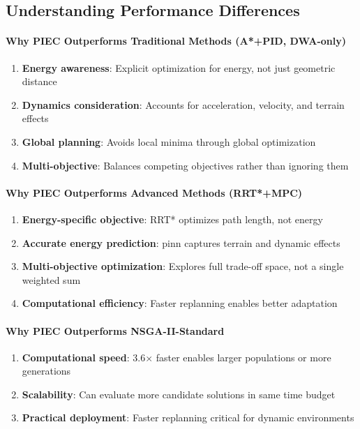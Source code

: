 \subsection{Understanding Performance Differences}

\paragraph{Why PIEC Outperforms Traditional Methods (A*+PID, DWA-only)}
\begin{enumerate}
    \item \textbf{Energy awareness}: Explicit optimization for energy, not just geometric distance
    \item \textbf{Dynamics consideration}: Accounts for acceleration, velocity, and terrain effects
    \item \textbf{Global planning}: Avoids local minima through global optimization
    \item \textbf{Multi-objective}: Balances competing objectives rather than ignoring them
\end{enumerate}

\paragraph{Why PIEC Outperforms Advanced Methods (RRT*+MPC)}
\begin{enumerate}
    \item \textbf{Energy-specific objective}: RRT* optimizes path length, not energy
    \item \textbf{Accurate energy prediction}: \acrshort{pinn} captures terrain and dynamic effects
    \item \textbf{Multi-objective optimization}: Explores full trade-off space, not a single weighted sum
    \item \textbf{Computational efficiency}: Faster replanning enables better adaptation
\end{enumerate}

\paragraph{Why PIEC Outperforms NSGA-II-Standard}
\begin{enumerate}
    \item \textbf{Computational speed}: 3.6$\times$ faster enables larger populations or more generations
    \item \textbf{Scalability}: Can evaluate more candidate solutions in same time budget
    \item \textbf{Practical deployment}: Faster replanning critical for dynamic environments
\end{enumerate}


